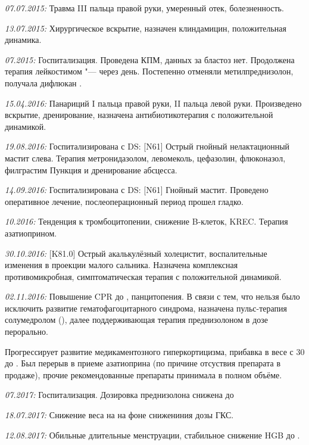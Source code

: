 \documentclass[a4paper,14pt]{extarticle}
\newcommand{\kilogramm}{кг}
\newcommand{\mug}{мкг}
\newcommand{\grammliter}{г/л}
\newcommand{\mgpl}{мг/л}
\newcommand{\mgpkg}{мг/кг}
\newcommand{\mgpd}{мг/сут.}
\newcommand{\mugpd}{мкг/сут.}
\newcommand{\mugpkg}{мкг/кг}
\newcommand{\tablets}{табл.}
\newcommand{\pdate}[1]{\emph{#1:} }
\newcommand{\DS}[2]{[#2] #1}
\begin{document}
\pdate{07.07.2015} Травма III пальца правой руки, умеренный отек, болезненность.

\pdate{13.07.2015} Хирургическое вскрытие, назначен клиндамицин, положительная динамика.

\pdate{07.2015} Госпитализация. Проведена КПМ, данных за бластоз нет. Продолжена терапия лейкостимом \numprint[\mugpkg]{5} "--- \numprint[\mug]{150} через день. Постепенно отменяли метилпреднизолон, получала дифлюкан \numprint[\mgpd]{100}.

\pdate{15.04.2016} Панариций I пальца правой руки, II пальца левой руки. Произведено вскрытие, дренирование, назначена антибиотикотерапия с положительной динамикой.

\pdate{19.08.2016} Госпитализирована с DS: \DS{Острый гнойный нелактационный мастит слева}{N61}. Терапия метронидазолом, левомеколь, цефазолин, флюконазол, филграстим \numprint[\mugpd]{150} Пункция и дренирование абсцесса.

\pdate{14.09.2016} Госпитализирована с DS: \DS{Гнойный мастит}{N61}. Проведено оперативное лечение, послеоперационный период прошел гладко.

\pdate{10.2016} Тенденция к тромбоцитопении, снижение B-клеток, KREC. Терапия азатиоприном.

\pdate{30.10.2016} \DS{Острый акалькулёзный холецистит}{K81.0}, воспалительные изменения в проекции малого сальника. Назначена комплексная противомикробная, симптоматическая терапия с положительной динамикой.

\pdate{02.11.2016} Повышение CPR до \numprint[\mgpl]{207}, панцитопения. В связи с тем, что нельзя было исключить развитие гематофагоцитарного синдрома, назначена пульс-терапия солумедролом (), далее поддерживающая терапия преднизолоном в дозе \numprint[\mgpkg]{0.5} перорально.

Прогрессирует развитие медикаментозного гиперкортицизма, прибавка в весе с 30 до \numprint[\kilogramm]{50}.
Был перерыв в приеме азатиоприна (по причине отсуствия препарата в продаже), прочие рекомендованные препараты принимала в полном объёме.

\pdate{07.2017} Госпитализация. Дозировка преднизолона снижена до \numprint[\tablets]{$1\frac{3}{4}$} 

\pdate{18.07.2017} Снижение веса на \numprint[\kilogramm]{9} на фоне снижениния дозы ГКС.

\pdate{12.08.2017} Обильные длительные менструации, стабильное снижение HGB до \numprint[\grammliter]{105}.
\end{document}
